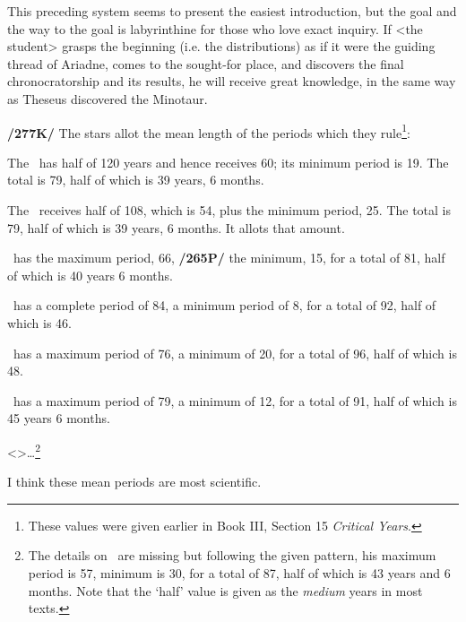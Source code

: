 This preceding system seems to present the easiest introduction, but the goal and the way to the goal is labyrinthine for those who love exact inquiry. If <the student> grasps the beginning (i.e. the
distributions) as if it were the guiding thread of Ariadne, comes to the sought-for place, and discovers the final chronocratorship and its results, he will receive great knowledge, in the same way as Theseus
discovered the Minotaur.

\textbf{/277K/} The stars allot the mean length of the periods which they rule\footnote{These values were given earlier in Book III, Section 15 \textsl{Critical Years}.}: 

The \Sun\, has half of 120 years and hence receives 60; its minimum period is 19. The total is 79, half of which is 39 years, 6 months.

The \Moon\, receives half of 108, which is 54, plus the minimum period, 25. The total is 79, half of which is 39 years, 6 months. It allots that amount. 

\Mars\, has the maximum period, 66, \textbf{/265P/} the minimum, 15, for a total of 81, half of which is 40 years 6 months.

\Venus\, has a complete period of 84, a minimum period of 8, for a total of 92, half of which is 46.

\Mercury\, has a maximum period of 76, a minimum of 20, for a total of 96, half of which is 48.

\Jupiter\, has a maximum period of 79, a minimum of 12, for a total of 91, half of which is 45 years 6 months.

<\Saturn>…\footnote{The details on \Saturn\, are missing but following the given pattern, his maximum period is 57, minimum is 30, for a total of 87, half of which is 43 years and 6 months. Note that the `half' value is given as the \textit{medium} years in most texts.}

I think these mean periods are most scientific.

\newpage